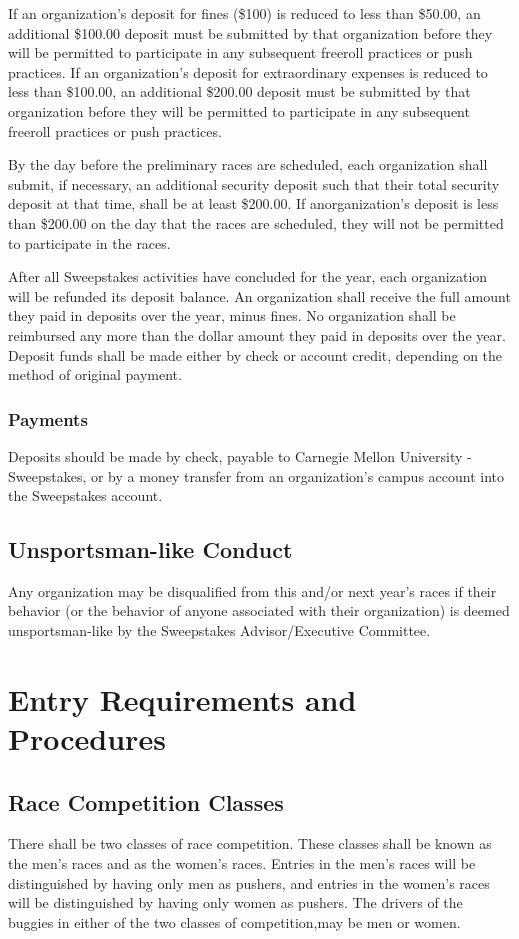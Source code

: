 \documentclass[openany]{book}
\begin{document}
If an organization's deposit for fines (\$100) is reduced to less than \$50.00, an additional \$100.00 deposit must be submitted by that organization before they will be permitted to participate in any subsequent freeroll practices or push practices. If an organization's deposit for extraordinary expenses is reduced to less than \$100.00, an additional \$200.00 deposit must be submitted by that organization before they will be permitted to participate in any subsequent freeroll practices or push practices.

By the day before the preliminary races are scheduled, each organization shall submit, if necessary, an additional security deposit such that their total security deposit at that time, shall be at least \$200.00. If anorganization's deposit is less than \$200.00 on the day that the races are scheduled, they will not be permitted to participate in the races.

After all Sweepstakes activities have concluded for the year, each organization will be refunded its deposit balance. An organization shall receive the full amount they paid in deposits over the year, minus fines. No organization shall be reimbursed any more than the dollar amount they paid in deposits over the year. Deposit funds shall be made either by check or account credit, depending on the method of original payment.

\subsection{Payments}
Deposits should be made by check, payable to Carnegie Mellon University - Sweepstakes, or by a money transfer from an organization's campus account into the Sweepstakes account.

\section{Unsportsman-like Conduct}
Any organization may be disqualified from this and/or next year's races if their behavior (or the behavior of anyone associated with their organization) is deemed unsportsman-like by the Sweepstakes Advisor/Executive Committee.

\chapter{Entry Requirements and Procedures}

\section{Race Competition Classes}
There shall be two classes of race competition. These classes shall be known as the men's races and as the women's races. Entries in the men's races will be distinguished by having only men as pushers, and entries in the women's races will be distinguished by having only women as pushers. The drivers of the buggies in either of the two classes of competition,may be men or women.
\end{document}
